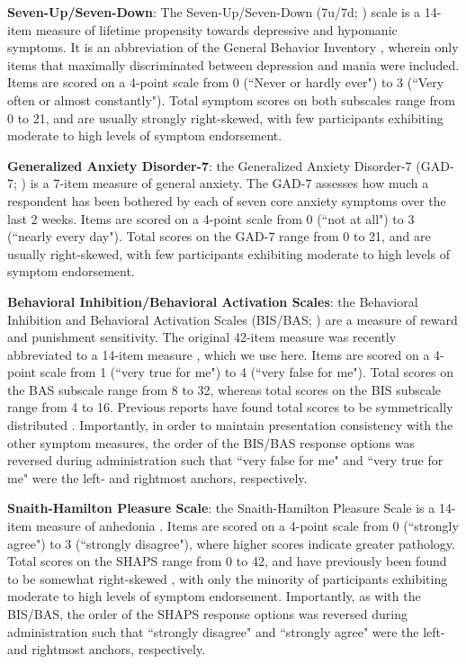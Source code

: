 \documentclass[a4paper,notitlepage,12pt]{article}
\begin{document}
\begin{refsection}[main]
\textbf{Seven-Up/Seven-Down}: The Seven-Up/Seven-Down (7u/7d; \cite{youngstrom_2013_susd}) scale is a 14-item measure of lifetime propensity towards depressive and hypomanic symptoms. It is an abbreviation of the General Behavior Inventory \cite{depue1981behavioral}, wherein only items that maximally discriminated between depression and mania were included. Items are scored on a 4-point scale from 0 (``Never or hardly ever") to 3 (``Very often or almost constantly"). Total symptom scores on both subscales range from 0 to 21, and are usually strongly right-skewed, with few participants exhibiting moderate to high levels of symptom endorsement. 

\textbf{Generalized Anxiety Disorder-7}: the Generalized Anxiety Disorder-7 (GAD-7; \cite{spitzer2006brief}) is a 7-item measure of general anxiety. The GAD-7 assesses how much a respondent has been bothered by each of seven core anxiety symptoms over the last 2 weeks. Items are scored on a 4-point scale from 0 (``not at all") to 3 (``nearly every day"). Total scores on the GAD-7 range from 0 to 21, and are usually right-skewed, with few participants exhibiting moderate to high levels of symptom endorsement.

\textbf{Behavioral Inhibition/Behavioral Activation Scales}: the Behavioral Inhibition and Behavioral Activation Scales (BIS/BAS; \cite{carver1994behavioral}) are a measure of reward and punishment sensitivity. The original 42-item measure was recently abbreviated to a 14-item measure \cite{pagliaccio2016revising}, which we use here. Items are scored on a 4-point scale from 1 (``very true for me") to 4 (``very false for me"). Total scores on the BAS subscale range from 8 to 32, whereas total scores on the BIS subscale range from 4 to 16. Previous reports have found total scores to be symmetrically distributed \cite{cooper2007behavioural}. Importantly, in order to maintain presentation consistency with the other symptom measures, the order of the BIS/BAS response options was reversed during administration such that ``very false for me" and ``very true for me" were the left- and rightmost anchors, respectively. 

\textbf{Snaith-Hamilton Pleasure Scale}: the Snaith-Hamilton Pleasure Scale is a 14-item measure of anhedonia \cite{snaith1995scale}. Items are scored on a 4-point scale from 0 (``strongly agree") to 3 (``strongly disagree"), where higher scores indicate greater pathology. Total scores on the SHAPS range from 0 to 42, and have previously been found to be somewhat right-skewed \cite{franken2007assessment, leventhal2015measuring}, with only the minority of participants exhibiting moderate to high levels of symptom endorsement. Importantly, as with the BIS/BAS, the order of the SHAPS response options was reversed during administration such that ``strongly disagree" and ``strongly agree" were the left- and rightmost anchors, respectively.


\end{refsection}
\end{document}

